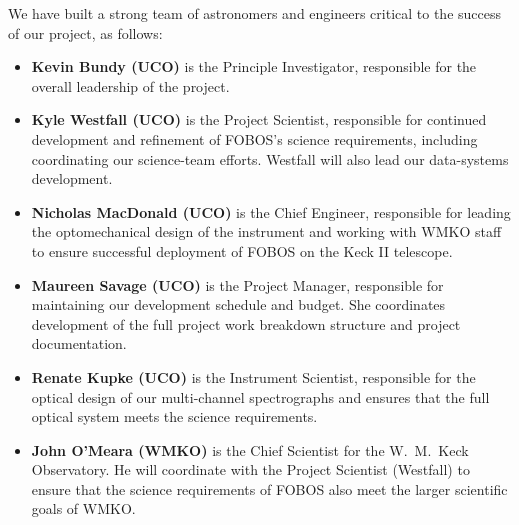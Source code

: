 \documentclass[oneside,11pt]{amsart}
\begin{document}


\begin{center}
\end{center}

\smallskip

\noindent We have built a strong team of astronomers and engineers
critical to the success of our project, as follows:
%
\begin{itemize}
%
\item {\bf Kevin Bundy (UCO)} is the Principle Investigator, responsible
for the overall leadership of the project.\\[-10pt]
%
\item {\bf Kyle Westfall (UCO)} is the Project Scientist, responsible
for continued development and refinement of FOBOS's science
requirements, including coordinating our science-team efforts.  Westfall
will also lead our data-systems development.\\[-10pt]
%
\item {\bf Nicholas MacDonald (UCO)} is the Chief Engineer, responsible
for leading the optomechanical design of the instrument and working with
WMKO staff to ensure successful deployment of FOBOS on the Keck II
telescope.\\[-10pt]
%
\item {\bf Maureen Savage (UCO)} is the Project Manager, responsible for
maintaining our development schedule and budget.  She coordinates
development of the full project work breakdown structure and project
documentation.\\[-10pt]
%
\item {\bf Renate Kupke (UCO)} is the Instrument Scientist, responsible
for the optical design of our multi-channel spectrographs and ensures
that the full optical system meets the science requirements.\\[-10pt]
%
\item {\bf John O'Meara (WMKO)} is the Chief Scientist for the
W.~M.~Keck Observatory.  He will coordinate with the Project Scientist
(Westfall) to ensure that the science requirements of FOBOS also meet
the larger scientific goals of WMKO.\\[-10pt]

\end{itemize}
\end{document}
